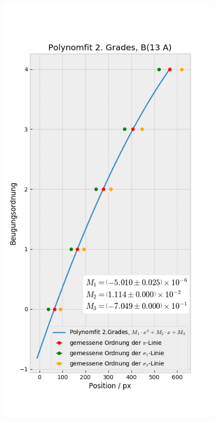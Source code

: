 \begin{landscape}
\begin{figure}
            \includegraphics[width=.45\paperwidth]{Auswertung/scatterorder/sco_13A}
          \end{figure}
        \end{landscape}
